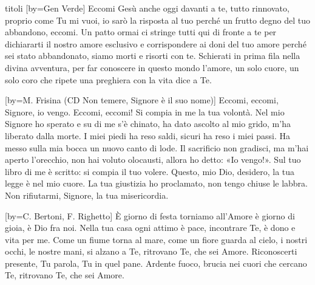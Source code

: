 \begin{songs}{titoli}
[by={Gen Verde}]
\beginchorus
Eccomi Gesù anche oggi davanti a te,
tutto rinnovato, proprio come Tu mi vuoi,
io sarò la risposta al tuo perché
un frutto degno del tuo abbandono, eccomi. 
\endchorus
\beginverse
Un patto ormai ci stringe tutti qui di fronte a te
per dichiararti il nostro amore esclusivo
e corrispondere ai doni del tuo amore
perché sei stato abbandonato, siamo morti e risorti con te.
\endverse
\beginverse
Schierati in prima fila nella divina avventura,
per far conoscere in questo mondo l'amore,
un solo cuore, un solo coro che
ripete una preghiera con la vita dice a Te.
\endverse
\endsong

[by={M. Frisina (CD Non temere, Signore è il suo nome)}]
\beginchorus
Eccomi, eccomi,
Signore, io vengo.
Eccomi, eccomi!
Si compia in me la tua volontà.
\endchorus
\beginverse
Nel mio Signore ho sperato
e su di me s'è chinato,
ha dato ascolto al mio grido,
m'ha liberato dalla morte.
\endverse
\beginverse
I miei piedi ha reso saldi,
sicuri ha reso i miei passi.
Ha messo sulla mia bocca
un nuovo canto di lode.
\endverse
\beginverse
Il sacrificio non gradisci,
ma m'hai aperto l'orecchio,
non hai voluto olocausti,
allora ho detto: «Io vengo!».
\endverse
\beginverse
Sul tuo libro di me è scritto:
si compia il tuo volere.
Questo, mio Dio, desidero,
la tua legge è nel mio cuore.
\endverse
\beginverse
La tua giustizia ho proclamato,
non tengo chiuse le labbra.
Non rifiutarmi, Signore,
la tua misericordia.
\endverse
\endsong

[by={C. Bertoni, F. Righetto}]
\beginchorus
È giorno di festa torniamo all'Amore
è giorno di gioia, è Dio fra noi.
Nella tua casa ogni attimo è pace, incontrare Te,
è dono e vita per me.
\endchorus
\beginverse
Come un fiume torna al mare, come un fiore guarda al cielo,
i nostri occhi, le nostre mani,
si alzano a Te, ritrovano Te, che sei Amore.
\endverse
\beginverse
Riconoscerti presente, Tu parola, Tu in quel pane.
Ardente fuoco, brucia nei cuori
che cercano Te, ritrovano Te, che sei Amore.
\endverse
\endsong


\end{songs}
